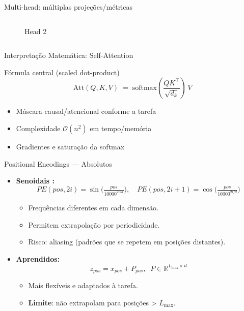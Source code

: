 \documentclass{beamer}
\begin{document}
\begin{frame}{Multi-head: múltiplas projeções/métricas}
\begin{columns}[c]
\begin{figure}
	\caption{Head 2}
  \end{figure}
\end{columns}
\end{frame}

\begin{frame}{Interpretação Matemática: Self-Attention}
	\begin{block}{Fórmula central (scaled dot-product)}
		\[
			\mathrm{Att}(Q,K,V) \;=\; \mathrm{softmax}\!\left(\frac{QK^\top}{\sqrt{d_k}}\right)\,V
		\]
	\end{block}
	\begin{itemize}
		\item Máscara causal/atencional conforme a tarefa
		\item Complexidade $\mathcal{O}(n^2)$ em tempo/memória
		\item Gradientes e saturação da softmax
	\end{itemize}
\end{frame}

\begin{frame}{Positional Encodings — Absolutos}
\begin{itemize}
  \item \textbf{Senoidais \cite{vaswani2017attention}:}
  \[
  PE(pos,2i)=\sin\!\Big(\tfrac{pos}{10000^{2i/d}}\Big),\quad
  PE(pos,2i{+}1)=\cos\!\Big(\tfrac{pos}{10000^{2i/d}}\Big)
  \]
  \begin{itemize}
    \item Frequências diferentes em cada dimensão.
    \item Permitem extrapolação por periodicidade.
    \item Risco: aliasing (padrões que se repetem em posições distantes).
  \end{itemize}

  \item \textbf{Aprendidos:}
  \[
  z_{pos}=x_{pos}+P_{pos},\;\; P\in\mathbb{R}^{L_{\max}\times d}
  \]
  \begin{itemize}
    \item Mais flexíveis e adaptados à tarefa.
    \item \textbf{Limite}: não extrapolam para posições > $L_{\max}$.
  \end{itemize}
\end{itemize}
\end{frame}
\end{document}
